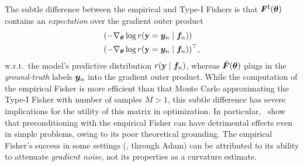 The subtle difference between the empirical and Type-I Fishers is that
${\bm{F}}^\text{I}({\bm{\theta}})$ contains an \emph{expectation} over the gradient
outer product
\begin{align*}
  &(-\nabla_{{\bm{\theta}}} \log r({\mathbf{y}} = {\bm{y}}_n \mid {\bm{f}}_n)) \\
  &(-\nabla_{{\bm{\theta}}} \log r({\mathbf{y}} = {\bm{y}}_n \mid {\bm{f}}_n))^{\top},
\end{align*}
w.r.t.~the model's predictive distribution $r({\mathbf{y}} \mid {\bm{f}}_n)$,
whereas $\hat{{\bm{F}}}({\bm{\theta}})$ plugs in the \emph{ground-truth} labels ${\bm{y}}_n$
into the gradient outer product. While the computation of the empirical Fisher
is more efficient than that Monte Carlo approximating the Type-I Fisher with
number of samples $M > 1$, this subtle difference
has severe implications for the utility of this matrix in optimization.
In particular,~\citet{kunstner2019limitations} show that preconditioning with
the empirical Fisher can have detrimental effects even in simple problems,
owing to its poor theoretical grounding. The empirical Fisher's success
in some settings (\eg, through Adam) can be attributed to its ability to attenuate
\emph{gradient noise}, not its properties as a curvature estimate.
